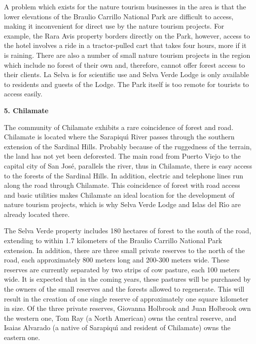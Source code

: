A problem which exists for the nature tourism businesses in the area
is that the lower elevations of the Braulio
Carrillo National Park are difficult to access, making it
inconvenient for direct use by the nature tourism projects.  For
example, the Rara Avis property borders directly on the Park,
however, access to the hotel involves a ride in a tractor-pulled
cart that takes four hours, more if it is raining.  There are also
a number of small nature tourism projects in the region which include
no forest of their own and, therefore, cannot offer forest access
to their clients.  La Selva is for scientific use and Selva Verde
Lodge is only available to residents and guests of the Lodge.  The
Park itself is too remote for tourists to access easily.

\LP
{\large {\bf 5. Chilamate}}
\eLP

The community of Chilamate exhibits a rare coincidence of forest
and road.  Chilamate is located where the Sarapiqu\'{\i} River passes
through the southern extension of the Sardinal Hills.  Probably
because of the ruggedness of the terrain, the land has not yet been
deforested.  The main road from Puerto Viejo to the capital city of
San Jos\'{e}, parallels the river, thus in Chilamate, there is easy
access to the forests of the Sardinal Hills.  In addition, electric
and telephone lines run along the road through Chilamate.  This
coincidence of forest with road access and basic utilities makes
Chilamate an ideal location for the development of nature tourism
projects, which is why Selva Verde Lodge and Islas del R\'{\i}o are
already located there.

The Selva Verde property includes 180 hectares of forest to the
south of the road, extending to within 1.7 kilometers of the
Braulio Carrillo National Park extension.  In addition, there are
three small private reserves to the north of the road, each
approximately 800 meters long and 200-300 meters wide.  These
reserves are currently separated by two strips of cow pasture, each
100 meters wide.  It is expected that in the coming years, these
pastures will be purchased by the owners of the small reserves and
the forests allowed to regenerate.  This will result in the creation
of one single reserve of approximately one square kilometer in
size.  Of the three private reserves, Giovanna Holbrook and Juan
Holbrook own the western one, Tom Ray (a North American) owns the central
reserve, and Isaias Alvarado (a native of Sarapiqu\'{\i} and resident of
Chilamate) owns the eastern one.

